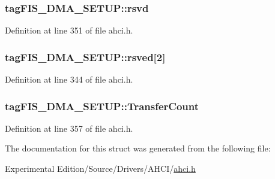 \subsubsection[{\texorpdfstring{rsvd}{rsvd}}]{ tag\+F\+I\+S\+\_\+\+D\+M\+A\+\_\+\+S\+E\+T\+U\+P\+::rsvd}\hypertarget{structtagFIS__DMA__SETUP_a655559568a515a7148f52086e16d9665}{}\label{structtagFIS__DMA__SETUP_a655559568a515a7148f52086e16d9665}


Definition at line 351 of file ahci.\+h.

\subsubsection[{\texorpdfstring{rsved}{rsved}}]{ tag\+F\+I\+S\+\_\+\+D\+M\+A\+\_\+\+S\+E\+T\+U\+P\+::rsved\mbox{[}2\mbox{]}}\hypertarget{structtagFIS__DMA__SETUP_acd0f922e38db3f3fc24d206bd7ce9c68}{}\label{structtagFIS__DMA__SETUP_acd0f922e38db3f3fc24d206bd7ce9c68}


Definition at line 344 of file ahci.\+h.

\subsubsection[{\texorpdfstring{Transfer\+Count}{TransferCount}}]{ tag\+F\+I\+S\+\_\+\+D\+M\+A\+\_\+\+S\+E\+T\+U\+P\+::\+Transfer\+Count}\hypertarget{structtagFIS__DMA__SETUP_abcd17669839d8c45ff2a2da1e881fd97}{}\label{structtagFIS__DMA__SETUP_abcd17669839d8c45ff2a2da1e881fd97}


Definition at line 357 of file ahci.\+h.



The documentation for this struct was generated from the following file\+:\begin{DoxyCompactItemize}
\item 
Experimental Edition/\+Source/\+Drivers/\+A\+H\+C\+I/\hyperlink{ahci_8h}{ahci.\+h}\end{DoxyCompactItemize}
